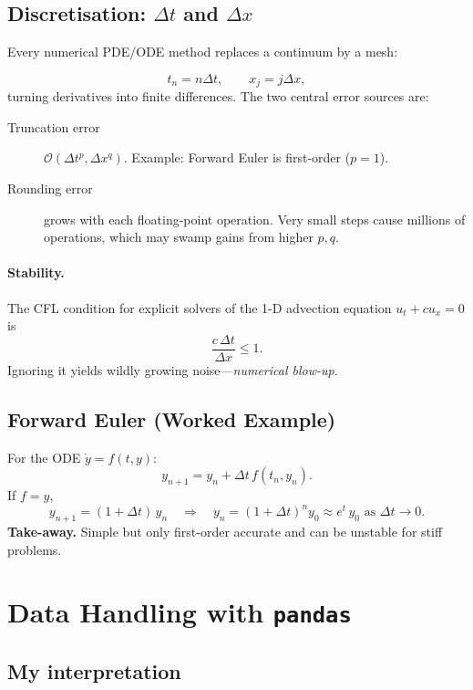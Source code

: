 \documentclass[a4paper,11pt]{article}
\begin{document}
\subsection{Discretisation: \texorpdfstring{$\Delta t$}{Dt} and \texorpdfstring{$\Delta x$}{Dx}}
Every numerical PDE/ODE method replaces a continuum by a mesh:

\[
  t_n = n\Delta t, \qquad x_j = j\Delta x,
\]
turning derivatives into finite differences.  The two central error sources are:

\begin{description}
  \item[Truncation error] $\mathcal O(\Delta t^{p},\Delta x^{q})$.  Example: Forward Euler is first-order ($p=1$).
  \item[Rounding error] grows with each floating-point operation.  Very small steps cause millions of operations, which may swamp gains from higher $p,q$.
\end{description}

\paragraph{Stability.} The CFL condition for explicit solvers of the 1-D advection equation $u_t+cu_x=0$ is
\[
  \boxed{\frac{c\,\Delta t}{\Delta x}\le 1}.
\]
Ignoring it yields wildly growing noise—\emph{numerical blow-up}.

\subsection{Forward Euler (Worked Example)}
For the ODE $\dot y = f(t,y)$:
\[
  y_{n+1}=y_n+\Delta t\,f(t_n,y_n).
\]
If $f=y$, 
\[
  y_{n+1}=(1+\Delta t)\,y_n\quad\Longrightarrow\quad
  y_n=(1+\Delta t)^n y_0\approx e^{t}\,y_0 \text{ as }\Delta t\to0.
\]
\textbf{Take-away.} Simple but only first-order accurate and can be unstable for stiff problems.

\section{Data Handling with \texttt{pandas}}
\subsection{My interpretation}
\end{document}
